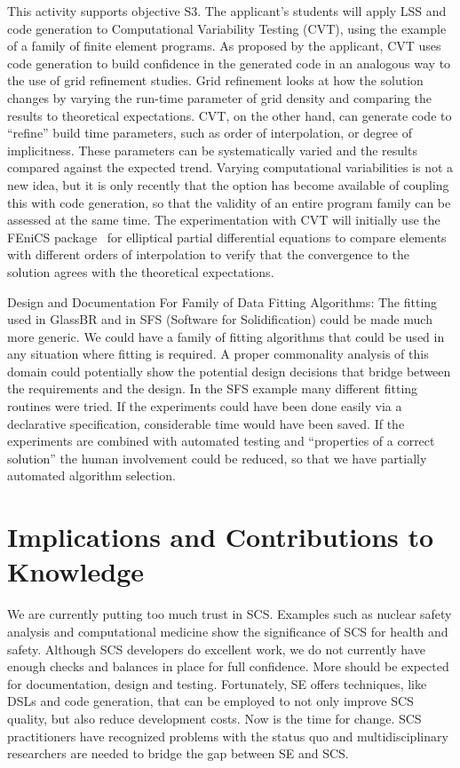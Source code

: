 \documentclass[12pt]{article}
\begin{document}
This activity supports objective S3.  The applicant's students will apply LSS
and code generation to Computational Variability Testing (CVT), using the
example of a family of finite element programs.  As proposed by the applicant,
CVT uses code generation to build confidence in the generated code in an
analogous way to the use of grid refinement studies.  Grid refinement looks at
how the solution changes by varying the run-time parameter of grid density and
comparing the results to theoretical expectations.  CVT, on the other hand, can
generate code to ``refine'' build time parameters, such as order of
interpolation, or degree of implicitness.  These parameters can be
systematically varied and the results compared against the expected trend.
Varying computational variabilities is not a new idea, but it is only recently
that the option has become available of coupling this with code generation, so
that the validity of an entire program family can be assessed at the same time.
The experimentation with CVT will initially use the FEniCS
package~\citep{LoggEtAl2012} for elliptical partial differential equations to
compare elements with different orders of interpolation to verify that the
convergence to the solution agrees with the theoretical expectations.

{Design and Documentation For Family of Data Fitting Algorithms}: The fitting
used in GlassBR and in SFS (Software for Solidification) could be made much more
generic.  We could have a family of fitting algorithms that could be used in any
situation where fitting is required.  A proper commonality analysis of this
domain could potentially show the potential design decisions that bridge between
the requirements and the design.  In the SFS example many different fitting
routines were tried.  If the experiments could have been done easily via a
declarative specification, considerable time would have been saved.  If the
experiments are combined with automated testing and ``properties of a correct
solution'' the human involvement could be reduced, so that we have partially
automated algorithm selection.

\section{Implications and Contributions to Knowledge}

We are currently putting too much trust in SCS.  Examples such as nuclear safety
analysis and computational medicine show the significance of SCS for health and
safety.  Although SCS developers do excellent work, we do not currently have
enough checks and balances in place for full confidence.  More should be
expected for documentation, design and testing.  Fortunately, SE offers
techniques, like DSLs and code generation, that can be employed to not only
improve SCS quality, but also reduce development costs.  Now is the time for
change.  SCS practitioners have recognized problems with the status quo and
multidisciplinary researchers are needed to bridge the gap between SE and SCS.
\end{document}
